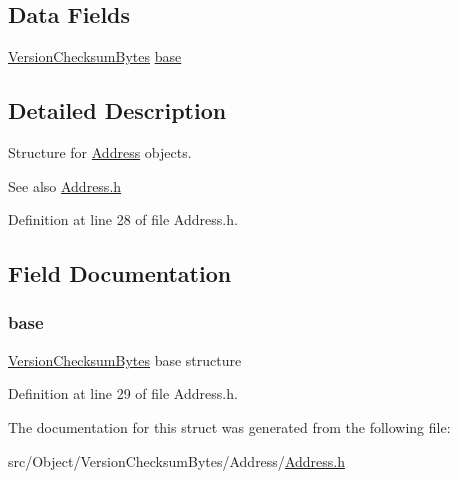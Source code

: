 \subsection*{Data Fields}
\begin{DoxyCompactItemize}
\item 
\hyperlink{struct_version_checksum_bytes}{VersionChecksumBytes} \hyperlink{struct_address_acad0c178a202fbaaa57486e58e9cdce2}{base}
\end{DoxyCompactItemize}


\subsection{Detailed Description}
Structure for \hyperlink{struct_address}{Address} objects. 

\begin{DoxySeeAlso}{See also}
\hyperlink{_address_8h}{Address.h} 
\end{DoxySeeAlso}


Definition at line 28 of file Address.h.



\subsection{Field Documentation}
\hypertarget{struct_address_acad0c178a202fbaaa57486e58e9cdce2}{
\subsubsection[{base}]{ {\bf base}}}
\label{struct_address_acad0c178a202fbaaa57486e58e9cdce2}
\hyperlink{struct_version_checksum_bytes}{VersionChecksumBytes} base structure 

Definition at line 29 of file Address.h.



The documentation for this struct was generated from the following file:\begin{DoxyCompactItemize}
\item 
src/Object/VersionChecksumBytes/Address/\hyperlink{_address_8h}{Address.h}\end{DoxyCompactItemize}
